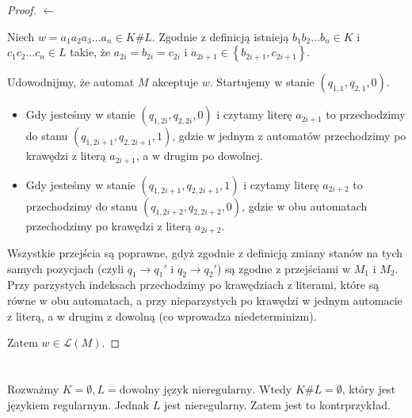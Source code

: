 \documentclass{article}
\theoremstyle{definition}
\theoremstyle{remark}
\begin{document}
\begin{proof}
    \(\leftarrow\)

    Niech \(w = a_1 a_2 a_3\ldots a_n \in K \# L\). Zgodnie z definicją istnieją \(b_1 b_2 \ldots b_n \in K\) i \(c_1 c_2 \ldots c_n \in L\) takie, że \(a_{2i} = b_{2i} = c_{2i}\) i \(a_{2i+1} \in \left\{ b_{2i+1}, c_{2i+1} \right\}\).
    
    
    Udowodnijmy, że automat \(M\) akceptuje \(w\). Startujemy w stanie \(\left(q_{1,1}, q_{2,1}, 0 \right)\).
    \begin{itemize}
        \item Gdy jesteśmy w stanie \(\left(q_{1,2i}, q_{2,2i}, 0 \right)\) i czytamy literę \(a_{2i+1}\)
        to przechodzimy do stanu \(\left(q_{1,2i+1}, q_{2,2i+1}, 1 \right)\),
        gdzie w jednym z automatów przechodzimy po krawędzi z literą \(a_{2i+1}\), a w drugim po dowolnej.
        \item Gdy jesteśmy w stanie \(\left(q_{1,2i+1}, q_{2,2i+1}, 1 \right)\) i czytamy literę \(a_{2i+2}\)
        to przechodzimy do stanu \(\left(q_{1,2i+2}, q_{2,2i+2}, 0 \right)\), gdzie w obu automatach przechodzimy po krawędzi z literą \(a_{2i+2}\).
    \end{itemize}

    Wszystkie przejścia są poprawne, gdyż zgodnie z definicją zmiany stanów na tych samych pozycjach (czyli \(q_1 \rightarrow q_1'\) i \(q_2 \rightarrow q_2'\))
    są zgodne z przejściami w \(M_1\) i \(M_2\).
    Przy parzystych indeksach przechodzimy po krawędziach z literami, które są równe w obu automatach,
    a przy nieparzystych po krawędzi w jednym automacie z literą, a w drugim z dowolną (co wprowadza niedeterminizm).

    Zatem \(w \in \mathcal{L}(M)\).
\end{proof}

\section{}

Rozważmy \(K = \emptyset, L = \text{dowolny język nieregularny}\). Wtedy
\(K \# L = \emptyset\), który jest językiem regularnym. Jednak \(L\)
jest nieregularny. Zatem jest to kontrprzykład.

\section{}
\end{document}
